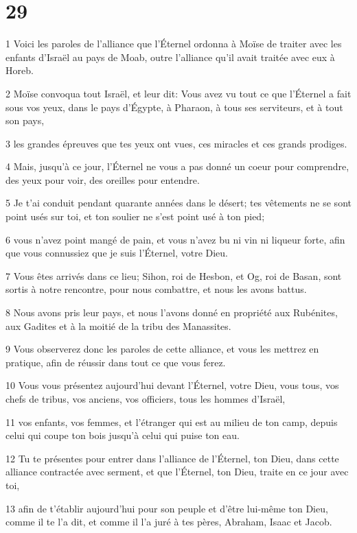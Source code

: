 \chapter{29}

\par 1 Voici les paroles de l'alliance que l'Éternel ordonna à Moïse de traiter avec les enfants d'Israël au pays de Moab, outre l'alliance qu'il avait traitée avec eux à Horeb.
\par 2 Moïse convoqua tout Israël, et leur dit: Vous avez vu tout ce que l'Éternel a fait sous vos yeux, dans le pays d'Égypte, à Pharaon, à tous ses serviteurs, et à tout son pays,
\par 3 les grandes épreuves que tes yeux ont vues, ces miracles et ces grands prodiges.
\par 4 Mais, jusqu'à ce jour, l'Éternel ne vous a pas donné un coeur pour comprendre, des yeux pour voir, des oreilles pour entendre.
\par 5 Je t'ai conduit pendant quarante années dans le désert; tes vêtements ne se sont point usés sur toi, et ton soulier ne s'est point usé à ton pied;
\par 6 vous n'avez point mangé de pain, et vous n'avez bu ni vin ni liqueur forte, afin que vous connussiez que je suis l'Éternel, votre Dieu.
\par 7 Vous êtes arrivés dans ce lieu; Sihon, roi de Hesbon, et Og, roi de Basan, sont sortis à notre rencontre, pour nous combattre, et nous les avons battus.
\par 8 Nous avons pris leur pays, et nous l'avons donné en propriété aux Rubénites, aux Gadites et à la moitié de la tribu des Manassites.
\par 9 Vous observerez donc les paroles de cette alliance, et vous les mettrez en pratique, afin de réussir dans tout ce que vous ferez.
\par 10 Vous vous présentez aujourd'hui devant l'Éternel, votre Dieu, vous tous, vos chefs de tribus, vos anciens, vos officiers, tous les hommes d'Israël,
\par 11 vos enfants, vos femmes, et l'étranger qui est au milieu de ton camp, depuis celui qui coupe ton bois jusqu'à celui qui puise ton eau.
\par 12 Tu te présentes pour entrer dans l'alliance de l'Éternel, ton Dieu, dans cette alliance contractée avec serment, et que l'Éternel, ton Dieu, traite en ce jour avec toi,
\par 13 afin de t'établir aujourd'hui pour son peuple et d'être lui-même ton Dieu, comme il te l'a dit, et comme il l'a juré à tes pères, Abraham, Isaac et Jacob.
